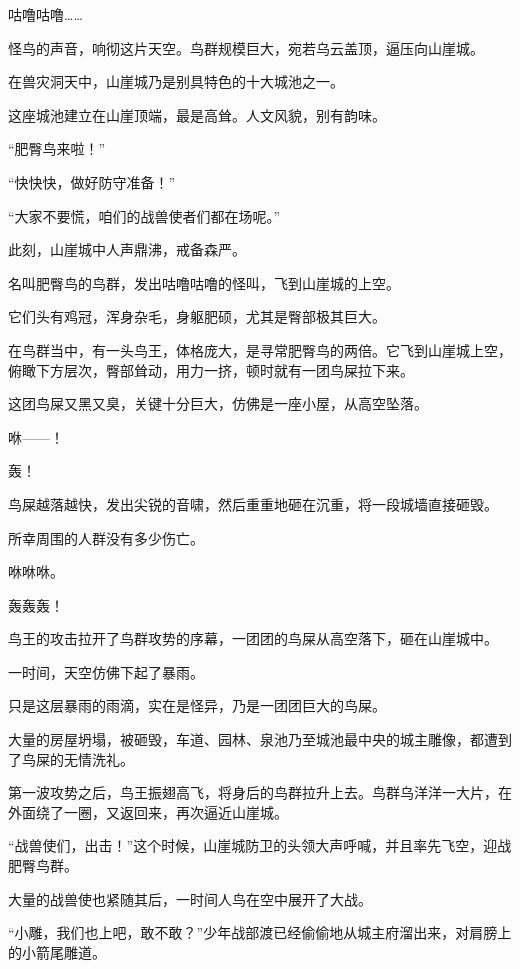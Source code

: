 
\begin{this_body}



咕噜咕噜……

怪鸟的声音，响彻这片天空。鸟群规模巨大，宛若乌云盖顶，逼压向山崖城。

在兽灾洞天中，山崖城乃是别具特色的十大城池之一。

这座城池建立在山崖顶端，最是高耸。人文风貌，别有韵味。

“肥臀鸟来啦！”

“快快快，做好防守准备！”

“大家不要慌，咱们的战兽使者们都在场呢。”

此刻，山崖城中人声鼎沸，戒备森严。

名叫肥臀鸟的鸟群，发出咕噜咕噜的怪叫，飞到山崖城的上空。

它们头有鸡冠，浑身杂毛，身躯肥硕，尤其是臀部极其巨大。

在鸟群当中，有一头鸟王，体格庞大，是寻常肥臀鸟的两倍。它飞到山崖城上空，俯瞰下方层次，臀部耸动，用力一挤，顿时就有一团鸟屎拉下来。

这团鸟屎又黑又臭，关键十分巨大，仿佛是一座小屋，从高空坠落。

咻——！

轰！

鸟屎越落越快，发出尖锐的音啸，然后重重地砸在沉重，将一段城墙直接砸毁。

所幸周围的人群没有多少伤亡。

咻咻咻。

轰轰轰！

鸟王的攻击拉开了鸟群攻势的序幕，一团团的鸟屎从高空落下，砸在山崖城中。

一时间，天空仿佛下起了暴雨。

只是这层暴雨的雨滴，实在是怪异，乃是一团团巨大的鸟屎。

大量的房屋坍塌，被砸毁，车道、园林、泉池乃至城池最中央的城主雕像，都遭到了鸟屎的无情洗礼。

第一波攻势之后，鸟王振翅高飞，将身后的鸟群拉升上去。鸟群乌洋洋一大片，在外面绕了一圈，又返回来，再次逼近山崖城。

“战兽使们，出击！”这个时候，山崖城防卫的头领大声呼喊，并且率先飞空，迎战肥臀鸟群。

大量的战兽使也紧随其后，一时间人鸟在空中展开了大战。

“小雕，我们也上吧，敢不敢？”少年战部渡已经偷偷地从城主府溜出来，对肩膀上的小箭尾雕道。


\end{this_body}
